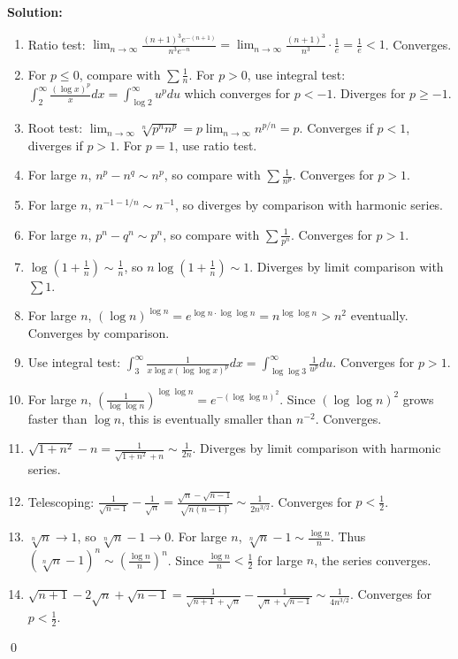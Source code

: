 \bigskip\noindent\textbf{Solution:}
\begin{enumerate}[label=(\alph*)]
\item Ratio test: \(\lim_{n\to\infty} \frac{(n+1)^3 e^{-(n+1)}}{n^3 e^{-n}} = \lim_{n\to\infty} \frac{(n+1)^3}{n^3} \cdot \frac{1}{e} = \frac{1}{e} < 1\). Converges.
\item For \(p \leq 0\), compare with \(\sum \frac{1}{n}\). For \(p > 0\), use integral test: \(\int_2^{\infty} \frac{(\log x)^p}{x} dx = \int_{\log 2}^{\infty} u^p du\) which converges for \(p < -1\). Diverges for \(p \geq -1\).
\item Root test: \(\lim_{n\to\infty} \sqrt[n]{p^n n^p} = p \lim_{n\to\infty} n^{p/n} = p\). Converges if \(p < 1\), diverges if \(p > 1\). For \(p = 1\), use ratio test.
\item For large \(n\), \(n^p - n^q \sim n^p\), so compare with \(\sum \frac{1}{n^p}\). Converges for \(p > 1\).
\item For large \(n\), \(n^{-1-1/n} \sim n^{-1}\), so diverges by comparison with harmonic series.
\item For large \(n\), \(p^n - q^n \sim p^n\), so compare with \(\sum \frac{1}{p^n}\). Converges for \(p > 1\).
\item \(\log(1 + \frac{1}{n}) \sim \frac{1}{n}\), so \(n \log(1 + \frac{1}{n}) \sim 1\). Diverges by limit comparison with \(\sum 1\).
\item For large \(n\), \((\log n)^{\log n} = e^{\log n \cdot \log \log n} = n^{\log \log n} > n^2\) eventually. Converges by comparison.
\item Use integral test: \(\int_3^{\infty} \frac{1}{x \log x (\log \log x)^p} dx = \int_{\log \log 3}^{\infty} \frac{1}{u^p} du\). Converges for \(p > 1\).
\item For large \(n\), \(\left(\frac{1}{\log \log n}\right)^{\log \log n} = e^{-(\log \log n)^2}\). Since \((\log \log n)^2\) grows faster than \(\log n\), this is eventually smaller than \(n^{-2}\). Converges.
\item \(\sqrt{1 + n^2} - n = \frac{1}{\sqrt{1 + n^2} + n} \sim \frac{1}{2n}\). Diverges by limit comparison with harmonic series.
\item Telescoping: \(\frac{1}{\sqrt{n-1}} - \frac{1}{\sqrt{n}} = \frac{\sqrt{n} - \sqrt{n-1}}{\sqrt{n(n-1)}} \sim \frac{1}{2n^{3/2}}\). Converges for \(p < \frac{1}{2}\).
\item \(\sqrt[n]{n} \to 1\), so \(\sqrt[n]{n} - 1 \to 0\). For large \(n\), \(\sqrt[n]{n} - 1 \sim \frac{\log n}{n}\). Thus \((\sqrt[n]{n} - 1)^n \sim \left(\frac{\log n}{n}\right)^n\). Since \(\frac{\log n}{n} < \frac{1}{2}\) for large \(n\), the series converges.
\item \(\sqrt{n+1} - 2\sqrt{n} + \sqrt{n-1} = \frac{1}{\sqrt{n+1} + \sqrt{n}} - \frac{1}{\sqrt{n} + \sqrt{n-1}} \sim \frac{1}{4n^{3/2}}\). Converges for \(p < \frac{1}{2}\).
\end{enumerate}\qed




